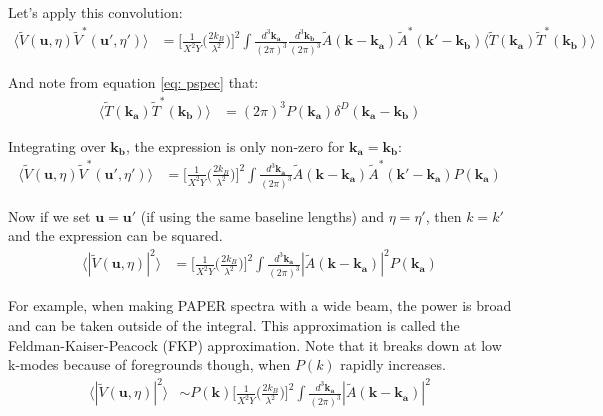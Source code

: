 \documentclass[12pt]{article}
\begin{document}
\noindent Let's apply this convolution:
\begin{align}
\langle \tilde{V}(\boldsymbol{u},\eta) \tilde{V}^{\ast}(\boldsymbol{u'},\eta') \rangle &= \bigg[{\frac{1}{X^{2}Y}}\Big({\frac{2k_{B}}{\lambda^{2}}}\Big)\bigg]^{2} \int {\frac{d^{3}\boldsymbol{k_{a}}}{(2\pi)^{3}}} {\frac{d^{3}\boldsymbol{k_{b}}}{(2\pi)^{3}}} \tilde{A}(\boldsymbol{k}-\boldsymbol{k_{a}}) \tilde{A}^{\ast}(\boldsymbol{k'}-\boldsymbol{k_{b}}) \langle \tilde{T}(\boldsymbol{k_{a}})\tilde{T}^{\ast}(\boldsymbol{k_{b}})\rangle
\end{align}

\noindent And note from equation \ref{eq: pspec} that:
\begin{align}
\langle \tilde{T}(\boldsymbol{k_{a}})\tilde{T}^{\ast}(\boldsymbol{k_{b}})\rangle &= (2\pi)^{3} P(\boldsymbol{k_{a}}) \delta^{D}(\boldsymbol{k_{a}}-\boldsymbol{k_{b}})
\end{align}

\noindent Integrating over $\boldsymbol{k_{b}}$, the expression is only non-zero for $\boldsymbol{k_{a}} = \boldsymbol{k_{b}}$: 
\begin{align}
\langle \tilde{V}(\boldsymbol{u},\eta) \tilde{V}^{\ast}(\boldsymbol{u'},\eta') \rangle &= \bigg[{\frac{1}{X^{2}Y}}\Big({\frac{2k_{B}}{\lambda^{2}}}\Big)\bigg]^{2} \int {\frac{d^{3}\boldsymbol{k_{a}}}{(2\pi)^{3}}}  \tilde{A}(\boldsymbol{k}-\boldsymbol{k_{a}}) \tilde{A}^{\ast}(\boldsymbol{k'}-\boldsymbol{k_{a}}) P(\boldsymbol{k_{a}})
\end{align}

\noindent Now if we set $\boldsymbol{u} = \boldsymbol{u'}$ (if using the same baseline lengths) and $\eta = \eta'$, then $k = k'$ and the expression can be squared.
\begin{align}
\langle |\tilde{V}(\boldsymbol{u},\eta) |^{2} \rangle &= \bigg[{\frac{1}{X^{2}Y}}\Big({\frac{2k_{B}}{\lambda^{2}}}\Big)\bigg]^{2} \int {\frac{d^{3}\boldsymbol{k_{a}}}{(2\pi)^{3}}} |\tilde{A}(\boldsymbol{k}-\boldsymbol{k_{a}})|^{2}P(\boldsymbol{k_{a}})
\end{align}

\noindent For example, when making PAPER spectra with a wide beam, the power is broad and can be taken outside of the integral. This approximation is called the Feldman-Kaiser-Peacock (FKP) approximation. Note that it breaks down at low k-modes because of foregrounds though, when $P(k)$ rapidly increases.
\begin{align}
\langle |\tilde{V}(\boldsymbol{u},\eta) |^{2} \rangle &\sim P(\boldsymbol{k})  \bigg[{\frac{1}{X^{2}Y}}\Big({\frac{2k_{B}}{\lambda^{2}}}\Big)\bigg]^{2} \int {\frac{d^{3}\boldsymbol{k_{a}}}{(2\pi)^{3}}} |\tilde{A}(\boldsymbol{k}-\boldsymbol{k_{a}})|^{2}
\end{align}
\end{document}
